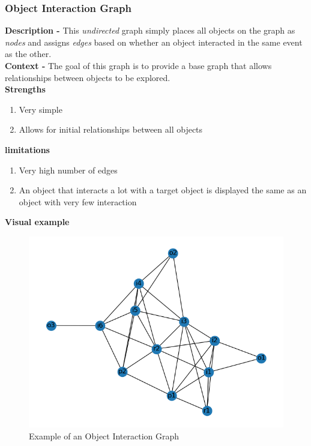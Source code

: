 \documentclass{article}
\begin{document}
\subsubsection{Object Interaction Graph}
\textbf{Description -} This \emph{undirected} graph simply places all objects on the graph as \emph{nodes} and assigns \emph{edges} based on whether an object interacted in the same event as the other.\\

\noindent \textbf{Context -} The goal of this graph is to provide a base graph that allows relationships between objects to be explored.
\\

\noindent\textbf{Strengths}
\begin{enumerate}
	\item Very simple
	\item Allows for initial relationships between all objects
\end{enumerate}

\noindent\textbf{limitations}
\begin{enumerate}
	\item Very high number of edges
	\item An object that interacts a lot with a target object is displayed the same as an object with very few interaction
\end{enumerate}

\noindent\textbf{Visual example}
\begin{figure}[h]
	\centering
	\includegraphics[scale=0.5]{images/object-graph.png}
	\caption{Example of an Object Interaction Graph}
	\label{fig:object-graph}
\end{figure}
\end{document}
